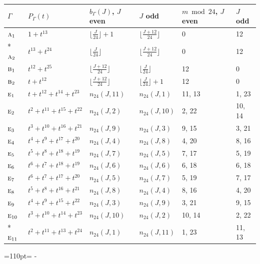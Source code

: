 \documentclass[10pt,a4paper]{article}
\newcommand{\needspace}[1]{\par\penalty-100\begingroup\dimen0=#1\relax\dimen2=\pagegoal
  \advance\dimen2-\pagetotal\ifdim\dimen0>\dimen2\relax\ifdim\dimen2>0pt\vfil\break\fi\fi
  \endgroup}
\numberwithin{equation}{section}
\newcommand{\irr}[1]{\text{\normalfont\scshape #1}}
\begin{document}
{\small{\renewcommand{\arraystretch}{1.3}\begin{longtable}{@{}llllll@{}}\toprule
$\Gamma$ & $P_\Gamma(t)$ & $b_\Gamma(J)$, $J$ even & $J$ odd & $m \bmod 24$, $J$ even & $J$ odd\\\midrule\endhead
\bottomrule\endfoot\endlastfoot
$\irr{a}_{1}$ & $1 + t^{13}$ & $\bigl\lfloor\tfrac{J}{24}\bigr\rfloor + 1$ & $\bigl\lfloor\tfrac{J+12}{24}\bigr\rfloor$ & 0 & 12\\*
$\irr{a}_{2}$ & $t^{13} + t^{24}$ & $\bigl\lfloor\tfrac{J}{24}\bigr\rfloor$ & $\bigl\lfloor\tfrac{J+12}{24}\bigr\rfloor$ & 0 & 12\\
$\irr{b}_{1}$ & $t^{12} + t^{25}$ & $\bigl\lfloor\tfrac{J+12}{24}\bigr\rfloor$ & $\bigl\lfloor\tfrac{J}{24}\bigr\rfloor$ & 12 & 0\\
$\irr{b}_{2}$ & $t + t^{12}$ & $\bigl\lfloor\tfrac{J+12}{24}\bigr\rfloor$ & $\bigl\lfloor\tfrac{J}{24}\bigr\rfloor + 1$ & 12 & 0\\
$\irr{e}_{1}$ & $t + t^{12} + t^{14} + t^{23}$ & $n_{24}(J,11)$ & $n_{24}(J,1)$ & 11, 13 & 1, 23\\
$\irr{e}_{2}$ & $t^{2} + t^{11} + t^{15} + t^{22}$ & $n_{24}(J,2)$ & $n_{24}(J,10)$ & 2, 22 & 10, 14\\
$\irr{e}_{3}$ & $t^{3} + t^{10} + t^{16} + t^{21}$ & $n_{24}(J,9)$ & $n_{24}(J,3)$ & 9, 15 & 3, 21\\
$\irr{e}_{4}$ & $t^{4} + t^{9} + t^{17} + t^{20}$ & $n_{24}(J,4)$ & $n_{24}(J,8)$ & 4, 20 & 8, 16\\
$\irr{e}_{5}$ & $t^{5} + t^{8} + t^{18} + t^{19}$ & $n_{24}(J,7)$ & $n_{24}(J,5)$ & 7, 17 & 5, 19\\
$\irr{e}_{6}$ & $t^{6} + t^{7} + t^{18} + t^{19}$ & $n_{24}(J,6)$ & $n_{24}(J,6)$ & 6, 18 & 6, 18\\
$\irr{e}_{7}$ & $t^{6} + t^{7} + t^{17} + t^{20}$ & $n_{24}(J,5)$ & $n_{24}(J,7)$ & 5, 19 & 7, 17\\
$\irr{e}_{8}$ & $t^{5} + t^{8} + t^{16} + t^{21}$ & $n_{24}(J,8)$ & $n_{24}(J,4)$ & 8, 16 & 4, 20\\
$\irr{e}_{9}$ & $t^{4} + t^{9} + t^{15} + t^{22}$ & $n_{24}(J,3)$ & $n_{24}(J,9)$ & 3, 21 & 9, 15\\
$\irr{e}_{10}$ & $t^{3} + t^{10} + t^{14} + t^{23}$ & $n_{24}(J,10)$ & $n_{24}(J,2)$ & 10, 14 & 2, 22\\*
$\irr{e}_{11}$ & $t^{2} + t^{11} + t^{13} + t^{24}$ & $n_{24}(J,1)$ & $n_{24}(J,11)$ & 1, 23 & 11, 13\\
\bottomrule\end{longtable}}}
\needspace{110pt}
\end{document}
